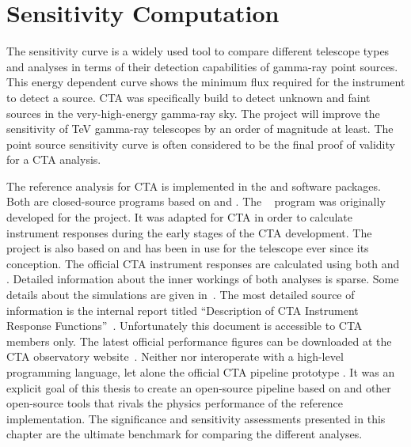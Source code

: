 \renewcommand{\Non}{N_\text{on}\xspace}
\renewcommand{\Noff}{N_\text{off}\xspace}
\renewcommand{\tobs}{t_{\text{obs}}\xspace}
\renewcommand{\talpha}{t_{\alpha}\xspace}
\newcommand{\mus}{\mu_{s}\xspace}
\newcommand{\mub}{\mu_{b}\xspace}
\newcommand{\muon}{{\mus + \talpha \mub}\xspace}
\newcommand{\Nsignal}{N_{s}\xspace}
\newcommand{\Nbkg}{N_{b}\xspace}
\newcommand{\lima}{Li\&Ma\xspace}
\newcommand{\onregion}{\theta_{\text{on}}\xspace}
\newcommand{\avg}[1]{\langle #1 \rangle}

\chapter{Sensitivity Computation}
\label{ch:sensi}

The sensitivity curve is a widely used tool to compare different telescope types and analyses in
terms of their detection capabilities of gamma-ray point sources.
This energy dependent curve shows the minimum flux required for the instrument to detect a source.
CTA was specifically build to detect unknown and faint sources in the very-high-energy gamma-ray sky. 
The project will improve the sensitivity of \si{TeV} gamma-ray telescopes by an order of magnitude at least.
The point source sensitivity curve is often considered to be the final proof of validity for a CTA analysis.

The reference analysis for CTA is implemented in the \eventdisplay and \mars software packages. Both are closed-source programs 
based on \cpp and \rootcern. The \eventdisplay~\cite{eventdisplay} program was originally developed for the \veritas project.
It was adapted for CTA in order to calculate instrument responses during the early stages of the CTA development. 
The \mars~\cite{magic_mars} project is also based on \rootcern and has been in use for the \magic telescope
ever since its conception. The official CTA instrument responses are calculated using both \mars and \eventdisplay. 
Detailed information about the inner workings of both analyses is sparse. Some details about the simulations are given in~\cite{cta_simulation}.
The most detailed source of information is the internal report titled \enquote{Description of CTA Instrument Response Functions}~\cite{cta_irf_report}.
Unfortunately this document is accessible to CTA members only. 
The latest official performance figures can be downloaded at the CTA observatory website~\cite{cta_website}.
Neither \mars nor \eventdisplay interoperate with a high-level programming language, let alone the 
official CTA pipeline prototype \ctapipe. It was an explicit goal of this thesis to 
create an open-source pipeline based on \ctapipe and other open-source tools that rivals the physics performance of the 
reference implementation.
The significance and sensitivity assessments presented in this chapter are the ultimate benchmark for comparing the different analyses.

